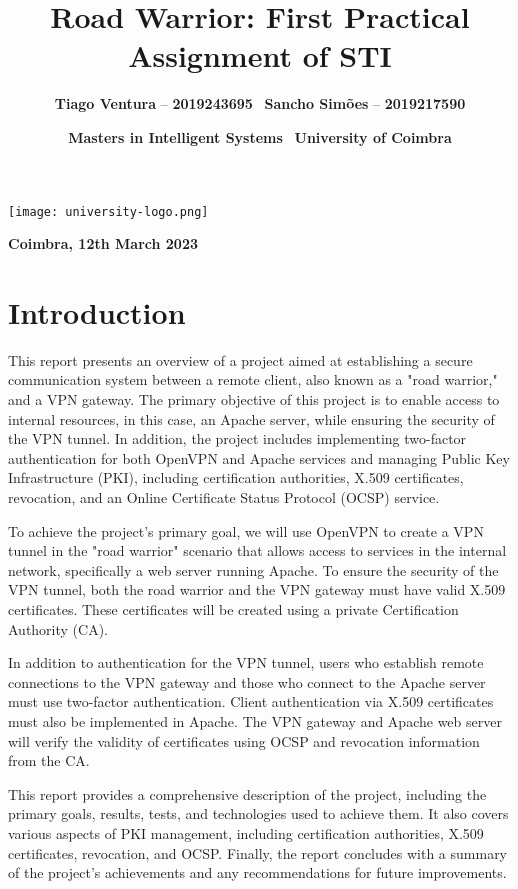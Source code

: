 \documentclass[12pt]{article}
\title{\textbf{\huge Road Warrior: First Practical Assignment of STI}}
\author{\textbf{\large Tiago Ventura} -- \textbf{\large 2019243695} \ \textbf{\large Sancho Simões} -- \textbf{\large 2019217590}}
\date{\textbf{\large Masters in Intelligent Systems} \ \textbf{\large University of Coimbra}}
\begin{document}
\maketitle

\begin{center}
\texttt{[image: university-logo.png]}
\end{center}

\begin{center}
\textbf{\large Coimbra, 12th March 2023}
\end{center}

\newpage

\tableofcontents

\newpage

\section{Introduction}
This report presents an overview of a project aimed at establishing a secure communication system between a remote client, also known as a "road warrior," and a VPN gateway. The primary objective of this project is to enable access to internal resources, in this case, an Apache server, while ensuring the security of the VPN tunnel. In addition, the project includes implementing two-factor authentication for both OpenVPN and Apache services and managing Public Key Infrastructure (PKI), including certification authorities, X.509 certificates, revocation, and an Online Certificate Status Protocol (OCSP) service.

To achieve the project's primary goal, we will use OpenVPN to create a VPN tunnel in the "road warrior" scenario that allows access to services in the internal network, specifically a web server running Apache. To ensure the security of the VPN tunnel, both the road warrior and the VPN gateway must have valid X.509 certificates. These certificates will be created using a private Certification Authority (CA).

In addition to authentication for the VPN tunnel, users who establish remote connections to the VPN gateway and those who connect to the Apache server must use two-factor authentication. Client authentication via X.509 certificates must also be implemented in Apache. The VPN gateway and Apache web server will verify the validity of certificates using OCSP and revocation information from the CA.

This report provides a comprehensive description of the project, including the primary goals, results, tests, and technologies used to achieve them. It also covers various aspects of PKI management, including certification authorities, X.509 certificates, revocation, and OCSP. Finally, the report concludes with a summary of the project's achievements and any recommendations for future improvements.
\end{document}
